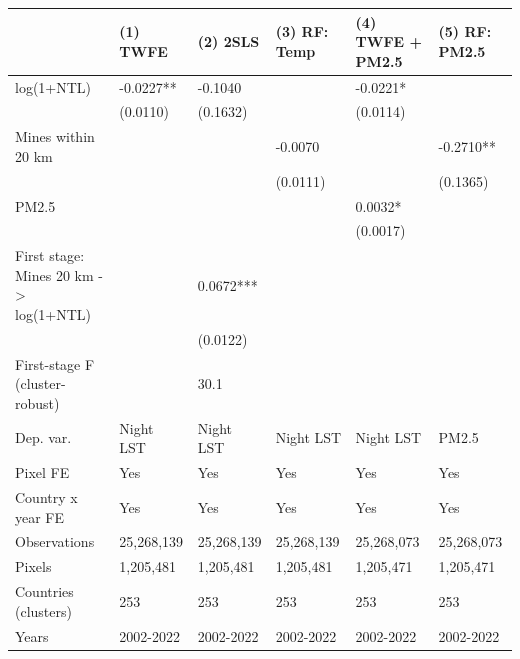 \begin{tabular}{llllll}
\toprule
 & (1) TWFE & (2) 2SLS & (3) RF: Temp & (4) TWFE + PM2.5 & (5) RF: PM2.5 \\
\midrule
log(1+NTL) & -0.0227** & -0.1040 &  & -0.0221* &  \\
 & (0.0110) & (0.1632) &  & (0.0114) &  \\
Mines within 20 km &  &  & -0.0070 &  & -0.2710** \\
 &  &  & (0.0111) &  & (0.1365) \\
PM2.5 &  &  &  & 0.0032* &  \\
 &  &  &  & (0.0017) &  \\
First stage: Mines 20 km -> log(1+NTL) &  & 0.0672*** &  &  &  \\
 &  & (0.0122) &  &  &  \\
First-stage F (cluster-robust) &  & 30.1 &  &  &  \\
Dep. var. & Night LST & Night LST & Night LST & Night LST & PM2.5 \\
Pixel FE & Yes & Yes & Yes & Yes & Yes \\
Country x year FE & Yes & Yes & Yes & Yes & Yes \\
Observations & 25,268,139 & 25,268,139 & 25,268,139 & 25,268,073 & 25,268,073 \\
Pixels & 1,205,481 & 1,205,481 & 1,205,481 & 1,205,471 & 1,205,471 \\
Countries (clusters) & 253 & 253 & 253 & 253 & 253 \\
Years & 2002-2022 & 2002-2022 & 2002-2022 & 2002-2022 & 2002-2022 \\
\bottomrule
\end{tabular}
